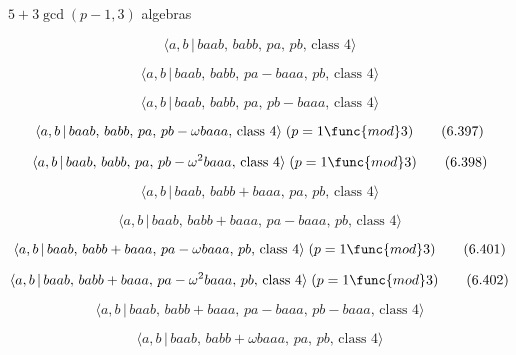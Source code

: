 \documentclass[10pt]{article}
\begin{document}
$5+3\gcd (p-1,3)$ algebras

\begin{equation}
\langle a,b\,|\,baab,\,babb,\,pa,\,pb,\,\text{class }4\rangle  \tag{6.394}
\end{equation}

\begin{equation}
\langle a,b\,|\,baab,\,babb,\,pa-baaa,\,pb,\,\text{class }4\rangle 
\tag{6.395}
\end{equation}

\begin{equation}
\langle a,b\,|\,baab,\,babb,\,pa,\,pb-baaa,\,\text{class }4\rangle 
\tag{6.396}
\end{equation}

\begin{equation}
\langle a,b\,|\,baab,\,babb,\,pa,\,pb-\omega baaa,\,\text{class }%
4\rangle\;(p=1 \func{mod} 3)  \tag{6.397}
\end{equation}

\begin{equation}
\langle a,b\,|\,baab,\,babb,\,pa,\,pb-\omega ^2baaa,\,\text{class }%
4\rangle\;(p=1 \func{mod} 3)  \tag{6.398}
\end{equation}

\begin{equation}
\langle a,b\,|\,baab,\,babb+baaa,\,pa,\,pb,\,\text{class }4\rangle 
\tag{6.399}
\end{equation}

\begin{equation}
\langle a,b\,|\,baab,\,babb+baaa,\,pa-baaa,\,pb,\,\text{class }4\rangle 
\tag{6.400}
\end{equation}

\begin{equation}
\langle a,b\,|\,baab,\,babb+baaa,\,pa-\omega baaa,\,pb,\,\text{class }%
4\rangle\;(p=1 \func{mod} 3)  \tag{6.401}
\end{equation}

\begin{equation}
\langle a,b\,|\,baab,\,babb+baaa,\,pa-\omega ^2baaa,\,pb,\,\text{class }%
4\rangle\;(p=1 \func{mod} 3)  \tag{6.402}
\end{equation}

\begin{equation}
\langle a,b\,|\,baab,\,babb+baaa,\,pa-baaa,\,pb-baaa,\,\text{class }4\rangle
\tag{6.403}
\end{equation}

\begin{equation}
\langle a,b\,|\,baab,\,babb+\omega baaa,\,pa,\,pb,\,\text{class }4\rangle 
\tag{6.404}
\end{equation}
\end{document}
